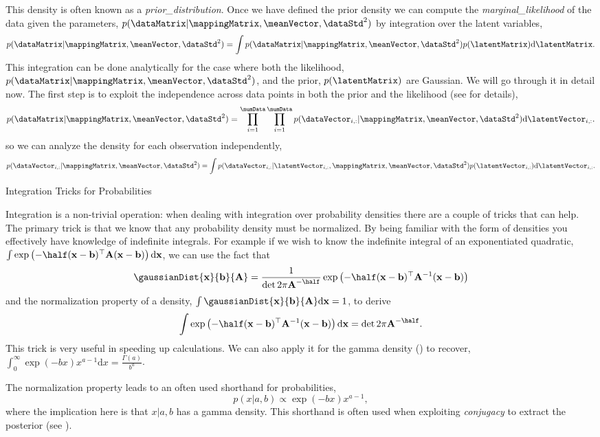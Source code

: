 This density is often known as a \emph{\gls{prior_distribution}}. Once we have defined the prior
density we can compute the \emph{\gls{marginal_likelihood}} of the data given the parameters,
$p(\dataMatrix|\mappingMatrix, \meanVector, \dataStd^2)$ by
integration over the latent variables,
\[
p(\dataMatrix|\mappingMatrix, \meanVector, \dataStd^2) = \int
p(\dataMatrix | \mappingMatrix, \meanVector,
\dataStd^2)p(\latentMatrix) \text{d}\latentMatrix.
\]
This integration can be done analytically for the case where both the
likelihood, $p(\dataMatrix| \mappingMatrix, \meanVector, \dataStd^2)$,
and the prior, $p(\latentMatrix)$ are Gaussian. We will go through it
in detail now. The first step is to exploit the independence across
data points in both the prior and the likelihood (see
 for details),
\[
p(\dataMatrix|\mappingMatrix, \meanVector, \dataStd^2) =
\prod_{i=1}^\numData \prod_{i=1}^\numData p(\dataVector_{i, :} |
\mappingMatrix, \meanVector, \dataStd^2) \text{d}\latentVector_{i,
  :}.
\]
so we can analyze the density for each observation independently,
\[
p(\dataVector_{i, :} | \mappingMatrix, \meanVector, \dataStd^2) = \int
p(\dataVector_{i, :}| \latentVector_{i, :}, \mappingMatrix,
\meanVector, \dataStd^2)p(\latentVector_{i, :})
\text{d}\latentVector_{i, :}.
\]
\begin{tipfloat}
  \caption{Integration Tricks for
    Probabilities} \label{tip:integrationTricks} 
  
  \boxfontsize Integration is a non-trivial operation: when dealing
  with integration over probability densities there are a couple of
  tricks that can help. The primary trick is that we know that any
  probability density must be normalized. By being familiar with the
  form of densities you effectively have knowledge of indefinite
  integrals. For example if we wish to know the indefinite integral of
  an exponentiated quadratic, $\int \exp
  \left(-\half(\mathbf{x}-\mathbf{b})^\top \mathbf{A} (\mathbf{x}
    -\mathbf{b})\right)\text{d}\mathbf{x}$, we can use the fact that
  \[
  \gaussianDist{\mathbf{x}}{\mathbf{b}}{\mathbf{A}} =
  \frac{1}{\det{2\pi \mathbf{A}}^{-\half}}\exp
  \left(-\half(\mathbf{x}-\mathbf{b})^\top \mathbf{A}^{-1}
    (\mathbf{x} -\mathbf{b})\right)
  \]
  and the normalization property of a density, $\int
  \gaussianDist{\mathbf{x}}{\mathbf{b}}{\mathbf{A}}
  \text{d}\mathbf{x} = 1$, to derive
  \[
  \int \exp \left(-\half(\mathbf{x}-\mathbf{b})^\top
    \mathbf{A}^{-1} (\mathbf{x}
    -\mathbf{b})\right)\text{d}\mathbf{x} = \det{2\pi
    \mathbf{A}}^{-\half}.
  \]
  This trick is very useful in speeding up calculations. We can also
  apply it for the gamma density () to recover,
  $\int_{0}^{\infty} \exp(-bx)x^{a-1}\text{d}x =
  \frac{\Gamma(a)}{b^a}$.
  
  The normalization property leads to an often used shorthand for
  probabilities,
  \[
  p(x|a, b) \propto \exp(-bx)x^{a-1},
  \]
  where the implication here is that $x|a, b$ has a gamma
  density. This shorthand is often used when exploiting
  \emph{conjugacy} to extract the posterior (see
  ).
\end{tipfloat}



